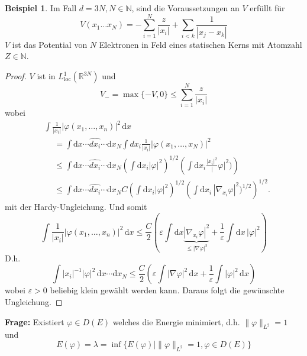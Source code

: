 \documentclass[
paper=a4,
bibtotocnumbered,
liststotocnumbered,
tablecaptionabove,
pointlessnumbers,
twoside,
openright,
10pt
]
{report}
\let\phi\varphi
\theoremstyle{definition}
\newtheorem*{bsp}{Beispiel}
\numberwithin{equation}{chapter}
\begin{document}
\begin{bsp}
Im Fall $d= 3N, N\in \mathbb N$, sind die Voraussetzungen an $V$ erfüllt für 
\begin{equation}
V(x_1 \ldots x_N) = - \sum_{i=1}^N \frac{z}{|x_i|} + \sum_{i<k} \frac{1}{|x_j - x_k|}
\end{equation}
$V$ ist das Potential von $N$ Elektronen in Feld eines statischen Kerns mit Atomzahl $Z\in \mathbb N$.
\end{bsp}
\begin{proof}
$V$ ist in $L_{\text{loc}}^1(\mathbb R^{3N})$ und
\begin{equation}
V_- = \max \{ -V, 0\} \le \sum_{i=1}^N \frac{z}{|x_i|}
\end{equation}
wobei 
\begin{align*}
&\int \frac{1}{|x_i|} |\phi(x_1,\ldots, x_n)|^2\, \mathrm dx\\
&\ \quad = \int \mathrm dx \cdots \widehat{dx_i} \cdots \mathrm dx_N \int dx_i\frac{1}{|x_i|} |\phi(x_1, \ldots, x_N)|^2\\
&\ \quad \le \int \mathrm dx \cdots \widehat{dx_i} \cdots \mathrm dx_N \left ( \int \mathrm dx_i |\phi|^2 \right )^{1/2} \left ( \int \mathrm dx_i  \frac{|x_i|^2} |\phi|^2) \right )\\
&\ \quad\le \int \mathrm dx \cdots \widehat{dx_i} \cdots \mathrm dx_N  C \left ( \int \mathrm dx_i|\phi|^2\right )^{1/2} \left ( \int \mathrm dx_i \, |\nabla_{x_i} \phi|^2)^{1/2}\right )^{1/2}.
\end{align*}
mit der Hardy-Ungleichung. Und somit
\begin{equation}
\int \frac{1}{|x_i|} |\phi(x_1,\ldots, x_n)|^2\, \mathrm dx \le \frac{C}{2} \left ( \varepsilon \int \mathrm dx \underbrace{|\nabla_{x_i} \phi|^2}_{\le |\nabla \phi|^2} + \frac{1}{\varepsilon} \int \mathrm dx\, |\phi|^2 \right )
\end{equation}
D.h.
\begin{equation}
\int |x_i|^{-1} |\phi|^2\, \mathrm dx \cdots \mathrm dx_N\le \frac{C}{2} \left ( \varepsilon \int |\nabla \phi|^2\, \mathrm dx + \frac{1}{\varepsilon} \int |\phi|^2\, \mathrm dx\right )
\end{equation}
wobei $\varepsilon >0$ beliebig klein gewählt werden kann. Daraus folgt die gewünschte Ungleichung.
\end{proof}

\textbf{Frage: } Existiert $\phi \in D(E)$ welches die Energie minimiert, d.h. $\|\phi\|_{L^2}=1$ und $$E(\phi) = \lambda = \inf \{ E(\phi) |\| \phi\|_{L^2} =1 , \phi \in D(E)\}$$
\end{document}

